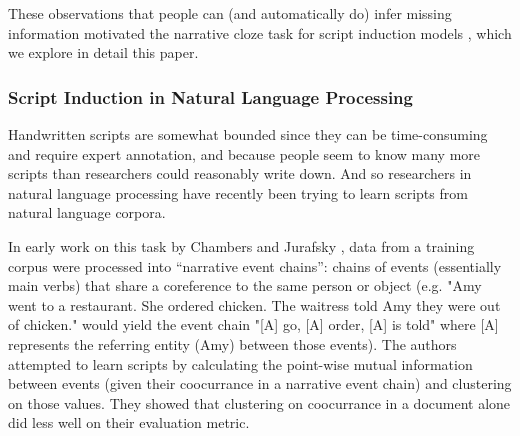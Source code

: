 \documentclass[10pt,a4paper]{article}
\newcommand{\todo}[1]{{\color{red}#1}}
\begin{document}
These observations that people can (and automatically do) infer missing information motivated the narrative cloze task for script induction models \cite{chambers2008unsupervised}, which we explore in detail this paper.

\subsubsection{Script Induction in Natural Language Processing}

Handwritten scripts are somewhat bounded since they can be time-consuming and require expert annotation, and because  people seem to know many more scripts than researchers could reasonably write down. And so researchers in natural language processing have recently been trying to learn scripts from natural language corpora.

In early work on this task by Chambers and Jurafsky , data from a training corpus were processed into “narrative event chains”: chains of events (essentially main verbs) that share a coreference to the same person or object (e.g. "Amy went to a restaurant. She ordered chicken. The waitress told Amy they were out of chicken." would yield the event chain "[A] go, [A] order, [A] is told" where [A] represents the referring entity (Amy) between those events). The authors attempted to learn scripts by calculating the point-wise mutual information between events (given their coocurrance in a narrative event chain) and clustering on those values. They showed that clustering on coocurrance in a document alone did less well on their evaluation metric.

% 
\end{document}
